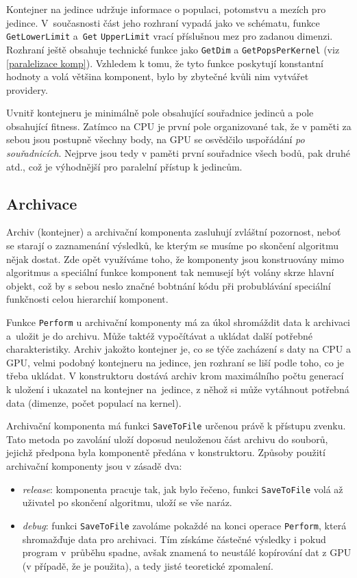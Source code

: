 Kontejner na jedince udržuje informace o populaci, potomstvu a mezích pro jedince. V~současnosti část jeho rozhraní vypadá jako ve schématu, funkce \texttt{GetLowerLimit} a~\texttt{Get} \texttt{UpperLimit} vrací příslušnou mez pro zadanou dimenzi. Rozhraní ještě obsahuje technické funkce jako \texttt{GetDim} a \texttt{GetPopsPerKernel} (viz \ref{paralelizace komp}). Vzhledem k tomu, že tyto funkce poskytují konstantní hodnoty a volá většina komponent, bylo by zbytečné kvůli nim vytvářet providery.

Uvnitř kontejneru je minimálně pole obsahující souřadnice jedinců a pole obsahující fitness. Zatímco na CPU je první pole organizované tak, že v paměti za sebou jsou postupně všechny body, na GPU se osvědčilo uspořádání \emph{po souřadnicích}. Nejprve jsou tedy v paměti první souřadnice všech bodů, pak druhé atd., což je výhodnější pro paralelní přístup k jedincům.

\subsection{Archivace}

Archiv (kontejner) a archivační komponenta zasluhují zvláštní pozornost, neboť se starají o zaznamenání výsledků, ke kterým se musíme po skončení algoritmu nějak dostat. Zde opět využíváme toho, že komponenty jsou konstruovány mimo algoritmus a speciální funkce komponent tak nemusejí být volány skrze hlavní objekt, což by s sebou neslo značné bobtnání kódu při probublávání speciální funkčnosti celou hierarchií komponent.

Funkce \texttt{Perform} u archivační komponenty má za úkol shromáždit data k archivaci a~uložit je do archivu. Může taktéž vypočítávat a ukládat další potřebné charakteristiky. Archiv jakožto kontejner je, co se týče zacházení s daty na CPU a GPU, velmi podobný kontejneru na jedince, jen rozhraní se liší podle toho, co je třeba ukládat. V konstruktoru dostává archiv krom maximálního počtu generací k uložení i ukazatel na kontejner na~jedince, z něhož si může vytáhnout potřebná data (dimenze, počet populací na kernel).

Archivační komponenta má funkci \texttt{SaveToFile} určenou právě k přístupu zvenku. Tato metoda po zavolání uloží doposud neuloženou část archivu do souborů, jejichž předpona byla komponentě předána v konstruktoru. Způsoby použití archivační komponenty jsou v zásadě dva:
\begin{itemize}
  \item \emph{release}: komponenta pracuje tak, jak bylo řečeno, funkci \texttt{SaveToFile} volá až uživatel po skončení algoritmu, uloží se vše naráz.
  \item \emph{debug}: funkci \texttt{SaveToFile} zavoláme pokaždé na konci operace \texttt{Perform}, která shromažďuje data pro archivaci. Tím získáme částečné výsledky i pokud program v~průbě\-hu spadne, avšak znamená to neustálé kopírování dat z GPU (v případě, že je použita), a tedy jisté teoretické zpomalení.
\end{itemize}

